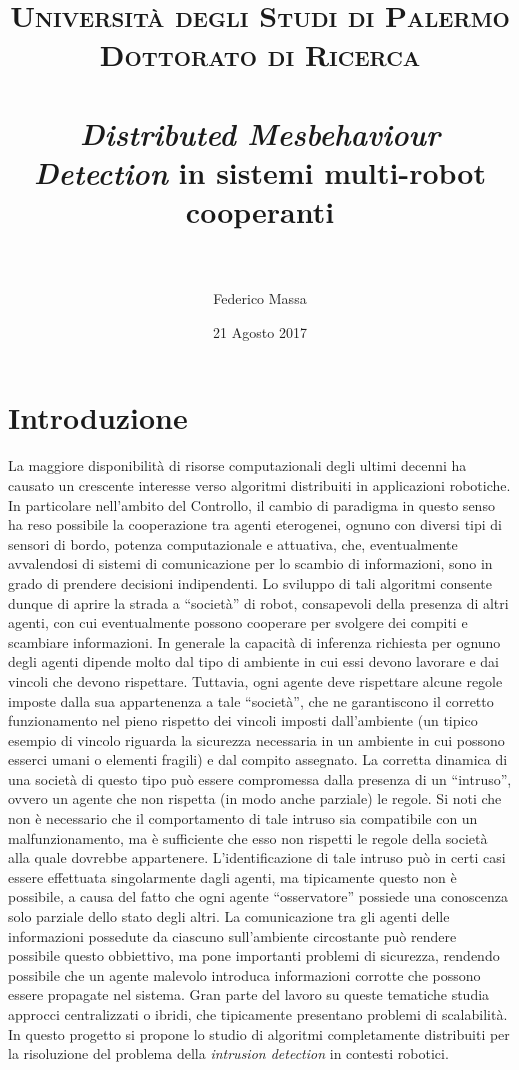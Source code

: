\documentclass[paper=a4, fontsize=11pt]{scrartcl} %
\title{	
\normalfont \normalsize 
\textsc{Università degli Studi di Palermo}\\
\textsc{Dottorato di Ricerca}\\[25pt] %
\horrule{0.5pt} \\[0.4cm] %
\huge \textit{Distributed Mesbehaviour Detection} in sistemi multi-robot cooperanti\\ %
\horrule{2pt} \\[0.5cm] %
}
\author{Federico Massa} %
\date{\normalsize 21 Agosto 2017} %
\numberwithin{equation}{section} %
\numberwithin{figure}{section} %
\numberwithin{table}{section} %
\begin{document}

\maketitle %


\section{Introduzione}

La maggiore disponibilità di risorse computazionali degli ultimi decenni ha causato un crescente interesse verso algoritmi distribuiti in applicazioni robotiche\cite{Lynch-book}. In particolare nell'ambito del Controllo, il cambio di paradigma in questo senso ha reso possibile la cooperazione tra agenti eterogenei, ognuno con
diversi tipi di sensori di bordo, potenza computazionale e attuativa, che, eventualmente avvalendosi di sistemi di comunicazione per lo scambio di informazioni, sono in grado di prendere decisioni indipendenti. Lo sviluppo di tali algoritmi consente dunque di aprire la strada a ``società'' di robot\cite{ram10-bfp}, consapevoli della presenza di altri agenti, con cui
eventualmente possono cooperare per svolgere dei compiti e scambiare informazioni. In generale la capacità di inferenza richiesta per ognuno degli agenti dipende molto dal tipo di ambiente in cui essi devono lavorare e dai vincoli che devono rispettare. Tuttavia, ogni agente deve rispettare alcune regole
imposte dalla sua appartenenza a tale ``società'', che ne garantiscono il corretto funzionamento nel pieno rispetto dei vincoli imposti dall'ambiente
(un tipico esempio di vincolo riguarda la sicurezza necessaria in un ambiente in cui possono esserci umani o elementi fragili) e dal compito assegnato. La corretta dinamica di una società di questo tipo può essere compromessa dalla presenza di un ``intruso'', ovvero un agente che non rispetta (in modo anche parziale) le regole. Si noti che non è necessario che il comportamento di tale intruso sia compatibile con un malfunzionamento, ma è sufficiente che esso non rispetti le regole della società alla quale dovrebbe appartenere. L'identificazione di tale
intruso può in certi casi essere effettuata singolarmente dagli agenti, ma 
tipicamente questo non è possibile, a causa del fatto che ogni agente ``osservatore'' possiede una conoscenza solo parziale dello stato degli altri.
La comunicazione tra gli agenti delle informazioni possedute da ciascuno sull'ambiente circostante può rendere possibile questo obbiettivo, ma pone 
importanti problemi di sicurezza, rendendo possibile che un agente malevolo introduca informazioni corrotte che possono essere propagate nel sistema. Gran parte del lavoro su queste tematiche studia approcci centralizzati o ibridi, che tipicamente presentano problemi di scalabilità. In questo progetto si propone lo studio di algoritmi completamente distribuiti per la risoluzione del problema della \textit{intrusion detection} in contesti robotici. 
\end{document}
